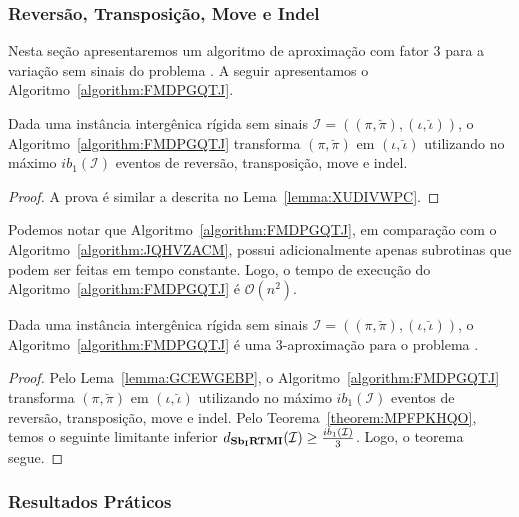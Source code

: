 \subsubsection{Reversão, Transposição, Move e Indel}

Nesta seção apresentaremos um algoritmo de aproximação com fator $3$ para a variação sem sinais do problema \SbIRTMI{}. A seguir apresentamos o Algoritmo~\ref{algorithm:FMDPGQTJ}.



\begin{lemma}\label{lemma:GCEWGEBP}
Dada uma instância intergênica rígida sem sinais $\mathcal{I}=((\pi,\breve\pi),(\iota,\breve\iota))$, o Algoritmo~\ref{algorithm:FMDPGQTJ} transforma $(\pi,\breve\pi)$ em $(\iota,\breve\iota)$ utilizando no máximo $ib_1(\mathcal{I})$ eventos de reversão, transposição, move e indel.
\end{lemma}
\begin{proof}
  A prova é similar a descrita no Lema~\ref{lemma:XUDIVWPC}.
\end{proof}

Podemos notar que Algoritmo~\ref{algorithm:FMDPGQTJ}, em comparação com o Algoritmo~\ref{algorithm:JQHVZACM}, possui adicionalmente apenas subrotinas que podem ser feitas em tempo constante. Logo, o tempo de execução do Algoritmo~\ref{algorithm:FMDPGQTJ} é $\mathcal{O}(n^2)$.  

\begin{theorem}\label{theorem:NHNVPGEA}
Dada uma instância intergênica rígida sem sinais $\mathcal{I}=((\pi,\breve\pi),(\iota,\breve\iota))$, o Algoritmo~\ref{algorithm:FMDPGQTJ} é uma $3$-aproximação para o problema \SbIRTMI{}.
\end{theorem}
\begin{proof}
Pelo Lema~\ref{lemma:GCEWGEBP}, o Algoritmo~\ref{algorithm:FMDPGQTJ} transforma $(\pi,\breve\pi)$ em $(\iota,\breve\iota)$ utilizando no máximo $ib_1(\mathcal{I})$ eventos de reversão, transposição, move e indel. Pelo Teorema~\ref{theorem:MPFPKHQO}, temos o seguinte limitante inferior $d_{\textbf{Sb\textsubscript{I}RTMI}}(\mathcal{I}) \ge \frac{ib_1(\mathcal{I})}{3}$. Logo, o teorema segue. 
\end{proof}

\subsubsection{Resultados Práticos}\label{subsubsection:SIEYCNVZ}

